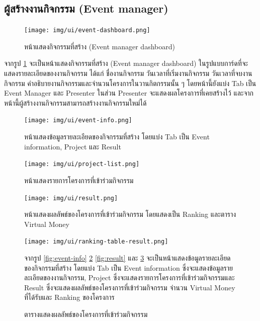 \clearpage
\subsection{ผู้สร้างงานกิจกรรม (Event manager)}
\begin{figure}[h!] %
    \begin{center}
        \texttt{[image: img/ui/event-dashboard.png]}
    \end{center}
    \caption{หน้าแสดงกิจกรรมที่สร้าง (Event manager dashboard)}
    \label{fig:event-dashboard}
\end{figure}
จากรูป \ref{fig:event-dashboard} จะเป็นหน้าแสดงกิจกรรมที่สร้าง (Event manager dashboard) ในรูปแบบการ์ดที่จะแสดงรายละเอียดของงานกิจกรรม ได้แก่ ชื่องานกิจกรรม วันเวลาที่เริ่มงานกิจกรรม วันเวลาที่จบงานกิจกรรม คำอธิบายงานกิจกรรมและจำนวนโครงการในวานกิตกรรมนั้น ๆ โดยหน้านี้ยังแบ่ง Tab เป็น Event Manager และ Presenter ในส่วน Presenter จะแสดงผลโครงการที่เคยสร้างไว้ และจากหน้านี้ผู้สร้างงานกิจกรรมสามารถสร้างงานกิจกรรมใหม่ได้

\clearpage
\begin{figure}
    \begin{center}
        \texttt{[image: img/ui/event-info.png]}
    \end{center}
    \caption{หน้าแสดงข้อมูลรายละเอียดของกิจกรรมที่สร้าง โดยแบ่ง Tab เป็น Event information, Project และ Result}
    \label{fig:event-info}

    \begin{center}
        \texttt{[image: img/ui/project-list.png]}
    \end{center}
    \caption{หน้าแสดงรายการโครงการที่เข้าร่วมกิจกรรม}
    \label{fig:project-list}
\end{figure}

\begin{figure}[t]
    \begin{center}
        \texttt{[image: img/ui/result.png]}
    \end{center}
    \caption{หน้าแสดงผลลัพธ์ของโครงการที่เข้าร่วมกิจกรรม โดยแสดงเป็น Ranking และตาราง Virtual Money}
    \label{fig:result}

    \begin{center}
        \texttt{[image: img/ui/ranking-table-result.png]}
    \end{center}
    \caption{ตารางแสดงผลลัพธ์ของโครงการที่เข้าร่วมกิจกรรม}
    \label{fig:ranking-table-result}
    จากรูป \ref{fig:event-info} \ref{fig:project-list} \ref{fig:result} และ \ref{fig:ranking-table-result} จะเป็นหน้าแสดงข้อมูลรายละเอียดของกิจกรรมที่สร้าง โดยแบ่ง Tab เป็น Event information ซึ่งจะแสดงข้อมูลรายละเอียดของงานกิจกรรม, Project ซึ่งจะแสดงรายการโครงการที่เข้าร่วมกิจกรรมและ Result ซึ่งจะแสดงผลลัพธ์ของโครงการที่เข้าร่วมกิจกรรม จำนวน Virtual Money ที่ได้รับและ Ranking ของโครงการ
\end{figure}


